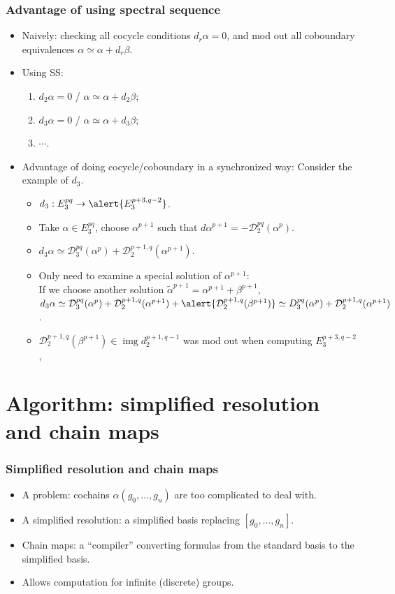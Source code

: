 \documentclass[xcolor=table, aspectratio=169]{beamer}
\DeclareMathOperator{\img}{img}
\begin{document}
\begin{frame}
	\frametitle{Advantage of using spectral sequence}
	\begin{itemize}
		\item Naively: checking all cocycle conditions $d_r\alpha=0$, and mod out all coboundary equivalences $\alpha\simeq\alpha+d_r\beta$.
		\item Using SS:
		\begin{enumerate}
			\item $d_2\alpha=0$ / $\alpha\simeq\alpha+d_2\beta$;
			\item $d_3\alpha=0$ / $\alpha\simeq\alpha+d_3\beta$;
			\item $\cdots$.
		\end{enumerate}
		\item Advantage of doing cocycle/coboundary in a synchronized way:
		Consider the example of $d_3$.
		\begin{itemize}
			\item $d_3:E^{pq}_3\rightarrow \alert{E^{p+3, q-2}_3}$.
			\item Take $\alpha\in E^{pq}_3$, choose $\alpha^{p+1}$ such that $d\alpha^{p+1}=-\mathcal D_2^{pq}(\alpha^p)$.
			\item $d_3\alpha\simeq\mathcal D^{pq}_3(\alpha^p)
			 + \mathcal D^{p+1,q}_2(\alpha^{p+1})$.
			 \item \alert{Only need to examine a special solution} of $\alpha^{p+1}$:\\
			 If we choose another solution $\tilde\alpha^{p+1}=\alpha^{p+1}+\beta^{p+1}$,\\
			 $d_3\alpha\simeq\mathcal D^{pq}_3(\alpha^p)
 			 + \mathcal D^{p+1,q}_2(\alpha^{p+1})+\alert{\mathcal D^{p+1,q}_2(\beta^{p+1})}\simeq D^{pq}_3(\alpha^p)
 			 + \mathcal D^{p+1,q}_2(\alpha^{p+1})$.
			 \item $\mathcal D^{p+1,q}_2(\beta^{p+1})\in\img d_2^{p+1,q-1}$ was mod out when computing $E^{p+3,q-2}_3$,
		\end{itemize}
	\end{itemize}
\end{frame}

\section{Algorithm: simplified resolution and chain maps}

\begin{frame}
	\frametitle{Simplified resolution and chain maps}
	\begin{itemize}
		\item A problem: cochains $\alpha(g_0,\ldots,g_n)$ are too complicated to deal with.
		\item A simplified resolution: a simplified basis replacing $[g_0,\ldots,g_n]$.
		\item Chain maps: a ``compiler'' converting formulas from the standard basis to the simplified basis.
		\item Allows computation for infinite (discrete) groups.
	\end{itemize}
\end{frame}
\end{document}
